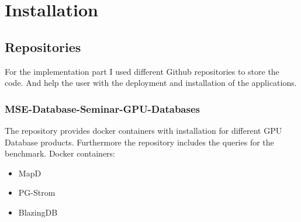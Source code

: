 \chapter{Installation}
\newpage

\section{Repositories}
For the implementation part I used different Github repositories to store the code.
And help the user with the deployment and installation of the applications.

\subsection{MSE-Database-Seminar-GPU-Databases}
The  repository provides
docker containers with installation for different GPU Database products.
Furthermore the repository includes the queries for the benchmark.
\medskip
Docker containers:
\begin{itemize}
    \item MapD
    \item PG-Strom
    \item BlazingDB
\end{itemize}
\newpage
